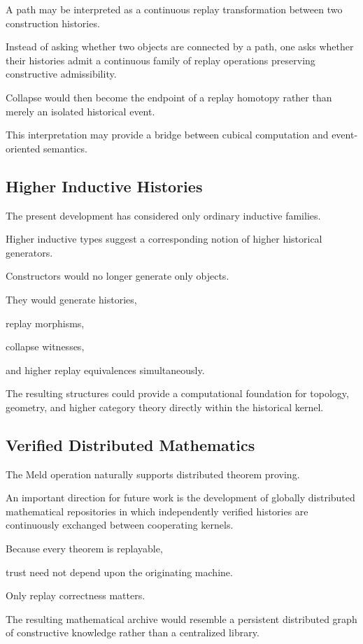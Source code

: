\documentclass[12pt,oneside]{article}
\theoremstyle{definition}
\theoremstyle{remark}
\begin{document}
A path may be interpreted as a continuous replay transformation between two
construction histories.

Instead of asking whether two objects are connected by a path, one asks whether
their histories admit a continuous family of replay operations preserving
constructive admissibility.

Collapse would then become the endpoint of a replay homotopy rather than merely
an isolated historical event.

This interpretation may provide a bridge between cubical computation and
event-oriented semantics.

\subsection{Higher Inductive Histories}

The present development has considered only ordinary inductive families.

Higher inductive types suggest a corresponding notion of higher historical
generators.

Constructors would no longer generate only objects.

They would generate histories,

replay morphisms,

collapse witnesses,

and higher replay equivalences simultaneously.

The resulting structures could provide a computational foundation for topology,
geometry, and higher category theory directly within the historical kernel.

\subsection{Verified Distributed Mathematics}

The Meld operation naturally supports distributed theorem proving.

An important direction for future work is the development of globally
distributed mathematical repositories in which independently verified histories
are continuously exchanged between cooperating kernels.

Because every theorem is replayable,

trust need not depend upon the originating machine.

Only replay correctness matters.

The resulting mathematical archive would resemble a persistent distributed graph
of constructive knowledge rather than a centralized library.
\end{document}
